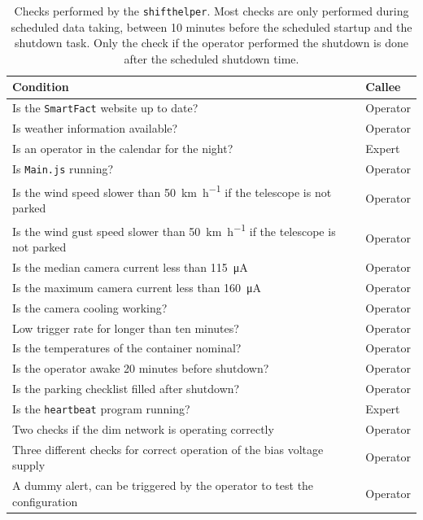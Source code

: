 \begin{table}
  \centering
  \caption{%
    Checks performed by the \texttt{shifthelper}.
    Most checks are only performed during scheduled data taking,
    between 10 minutes before the scheduled startup and the shutdown task.
    Only the check if the operator performed the shutdown is done after the scheduled
    shutdown time.
  }\label{tab:checks}
  \begin{tabular}{p{} l}
    \toprule
    Condition & Callee \\
    \midrule
    Is the \texttt{SmartFact} website up to date? & Operator \\
    Is weather information available? & Operator \\
    Is an operator in the calendar for the night? & Expert \\
    Is \texttt{Main.js} running? & Operator \\
    Is the wind speed slower than \SI{50}{\km\per\hour} if the telescope is not parked & Operator \\ 
    Is the wind gust speed slower than \SI{50}{\km\per\hour} if the telescope is not parked & Operator \\ 
    Is the median camera current less than \SI{115}{\micro\ampere} & Operator \\ 
    Is the maximum camera current less than \SI{160}{\micro\ampere} & Operator \\ 
    Is the camera cooling working? & Operator \\
    Low trigger rate for longer than ten minutes? & Operator \\
    Is the temperatures of the container nominal?  & Operator \\
    Is the operator awake 20 minutes before shutdown? & Operator \\
    Is the parking checklist filled after shutdown? & Operator \\
    Is the \texttt{heartbeat} program running? & Expert \\
    Two checks if the \gls{dim} network is operating correctly & Operator \\
    Three different checks for correct operation of the bias voltage supply & Operator \\
    A dummy alert, can be triggered by the operator to test the configuration & Operator \\
    \bottomrule
  \end{tabular}
\end{table}

